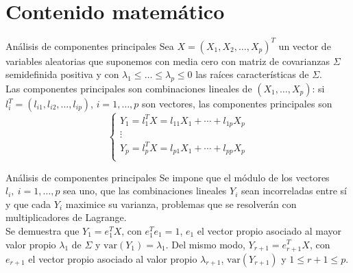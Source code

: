 \documentclass[leqno]{beamer}
\begin{document}
\section{Contenido matemático}

\begin{frame}{Análisis de componentes principales}
Sea $X = (X_1, X_2, \dots, X_p)^T$ un vector de variables aleatorias que suponemos con media cero con matriz de covarianzas $\Sigma$ semidefinida positiva y con $\lambda_1 \leq \dots \leq \lambda_p \leq 0$ las raíces características de $\Sigma$.\\

Las componentes principales son combinaciones lineales de $(X_1, \dots, X_p)$: si $l_i^T=(l_{i1}, l_{i2}, \dots, l_{ip})$, $i=1,\dots,p$ son vectores, las componentes principales son
\begin{equation*}
  \left\lbrace
  \begin{array}{l}
     Y_1 = l_1^TX = l_{11}X_1 + \cdots + l_{1p}X_p \\
     \vdots \\
     Y_p = l_p^TX = l_{p1}X_1 + \cdots + l_{pp}X_p \\
  \end{array}
  \right.
\end{equation*}
\end{frame}

\begin{frame}{Análisis de componentes principales}
Se impone que el módulo de los vectores $l_i,\ i=1,\dots,p$ sea uno, que las combinaciones lineales $Y_i$ sean incorreladas entre sí y que cada $Y_i$ maximice su varianza, problemas que se resolverán con multiplicadores de Lagrange.\\
Se demuestra que $Y_1 = e_1^TX$, con $e_1^Te_1=1$, $e_1$ el vector propio asociado al mayor valor propio $\lambda_1$ de $\Sigma$ y $\text{var}(Y_1) = \lambda_1$. Del mismo modo, $Y_{r+1} = e_{r+1}^T X$, con $e_{r+1}$ el vector propio asociado al valor propio $\lambda_{r+1}$, $\text{var}(Y_{r+1})$ y $1 \leq r+1 \leq p$.

\end{frame}

\end{document}
